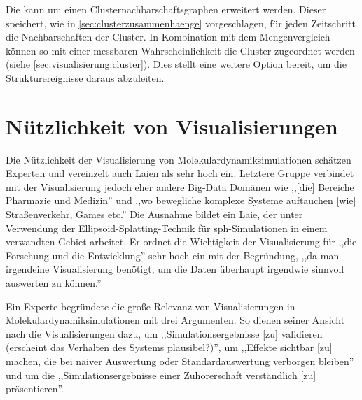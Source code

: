 Die \SECC kann um einen Clusternachbarschaftsgraphen erweitert werden. Dieser speichert, wie in \autoref{sec:clusterzusammenhaenge} vorgeschlagen, für jeden Zeitschritt die Nachbarschaften der Cluster. In Kombination mit dem Mengenvergleich können so mit einer messbaren Wahrscheinlichkeit die Cluster zugeordnet werden (siehe \autoref{sec:visualisierung:cluster}). %
Dies stellt eine weitere Option bereit, um die Strukturereignisse daraus abzuleiten.

\section{Nützlichkeit von Visualisierungen}
Die Nützlichkeit der Visualisierung von Molekulardynamiksimulationen schätzen Experten und vereinzelt auch Laien als sehr hoch ein. Letztere Gruppe verbindet mit der Visualisierung jedoch eher andere Big-Data Domänen wie ,,[die] Bereiche Pharmazie und Medizin'' und ,,wo bewegliche komplexe Systeme auftauchen [wie] Straßenverkehr, Games etc.'' Die Ausnahme bildet ein Laie, der unter Verwendung der Ellipsoid-Splatting-Technik für \gls{sph}-Simulationen in einem verwandten Gebiet arbeitet. Er ordnet die Wichtigkeit der Visualisierung für ,,die Forschung und die Entwicklung'' sehr hoch ein mit der Begründung, ,,da man irgendeine Visualisierung benötigt, um die Daten überhaupt irgendwie sinnvoll auswerten zu können.''

Ein Experte begründete die große Relevanz von Visualisierungen in Molekulardynamiksimulationen mit drei Argumenten. So dienen seiner Ansicht nach die Visualisierungen dazu, um ,,Simulationsergebnisse [zu] validieren (erscheint das Verhalten des Systems plausibel?)'', um ,,Effekte sichtbar [zu] machen, die bei naiver Auswertung oder Standardauswertung verborgen bleiben'' und um die ,,Simulationsergebnisse einer Zuhörerschaft verständlich [zu] präsentieren''.


